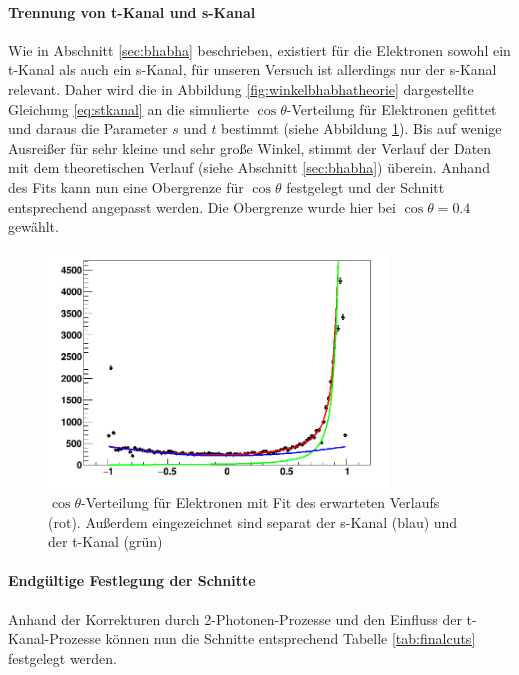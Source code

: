 \paragraph{Trennung von t-Kanal und s-Kanal}
Wie in Abschnitt \ref{sec:bhabha} beschrieben, existiert für die Elektronen sowohl ein t-Kanal als auch ein s-Kanal, für unseren Versuch ist allerdings nur der s-Kanal relevant. Daher wird die in Abbildung \ref{fig:winkelbhabhatheorie} dargestellte Gleichung \ref{eq:stkanal} an die simulierte $\cos\theta$-Verteilung für Elektronen gefittet und daraus die Parameter $s$ und $t$ bestimmt (siehe Abbildung \ref{fig:stkanal}). Bis auf wenige Ausreißer für sehr kleine und sehr große Winkel, stimmt der Verlauf der Daten mit dem theoretischen Verlauf (siehe Abschnitt \ref{sec:bhabha}) überein. Anhand des Fits kann nun eine Obergrenze für $\cos\theta$ festgelegt und der Schnitt entsprechend angepasst werden. Die Obergrenze wurde hier bei $\cos\theta=0.4$ gewählt.

\begin{figure}
	\centering
	\includegraphics[width=0.8\textwidth]{../figures/stkanal.png}
	\caption[$\cos\theta$-Verteilung für Elektronen mit Fit des erwarteten Verlaufs]{$\cos\theta$-Verteilung für Elektronen mit Fit des erwarteten Verlaufs (rot). Außerdem eingezeichnet sind separat der s-Kanal (blau) und der t-Kanal (grün)}
	\label{fig:stkanal}
\end{figure}

\paragraph{Endgültige Festlegung der Schnitte}
Anhand der Korrekturen durch 2-Photonen-Prozesse und den Einfluss der t-Kanal-Prozesse können nun die Schnitte entsprechend Tabelle \ref{tab:finalcuts} festgelegt werden.

